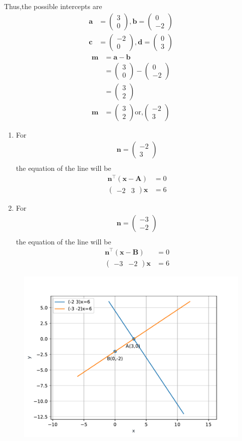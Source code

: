 \documentclass[10pt]{article}
\providecommand{\brak}[1]{\ensuremath{\left(#1\right)}}
\newcommand{\myvec}[1]{\ensuremath{\begin{pmatrix}#1\end{pmatrix}}}
\let\vec\mathbf{}
\begin{document}
Thus,the possible intercepts are\\
\begin{align}
\vec{a}&=\myvec{3\\0},\vec{b}=\myvec{0\\-2}\\
\vec{c}&=\myvec{-2\\0},\vec{d}=\myvec{0\\3}
\end{align}
\begin{align}
\vec{m}&=\vec{a}-\vec{b}\\
&=\myvec{3\\0}-\myvec{0\\-2}\\
&=\myvec{3\\2}\\
\vec{m}&=\myvec{3\\2} \text{or,} \myvec{-2\\3}
\end{align}
\begin{enumerate}
\item For\\
\begin{align}
\vec{n} = \myvec{ -2\\3}\\
\end{align}
the equation of the line will be\\
\begin{align}
\vec{n}^{\top}\brak{\vec{x}-\vec{A}}&=0\\
\myvec{-2&3}\vec{x}&=6
\end{align}
\item For\\
\begin{align}
\vec{n}=\myvec{-3\\-2}\\
\end{align}
the equation of the line will be\\
\begin{align}
\vec{n}^{\top}\brak{\vec{x}-\vec{B}}&=0\\
\myvec{-3&-2}\vec{x}&=6
\end{align}
\end{enumerate}
\begin{figure}[!h]
	\begin{center}
		\includegraphics[width=\columnwidth]{./figs/fig.pdf}
	\end{center}
\caption{}
\label{figure}
\end{figure}
\end{document}

